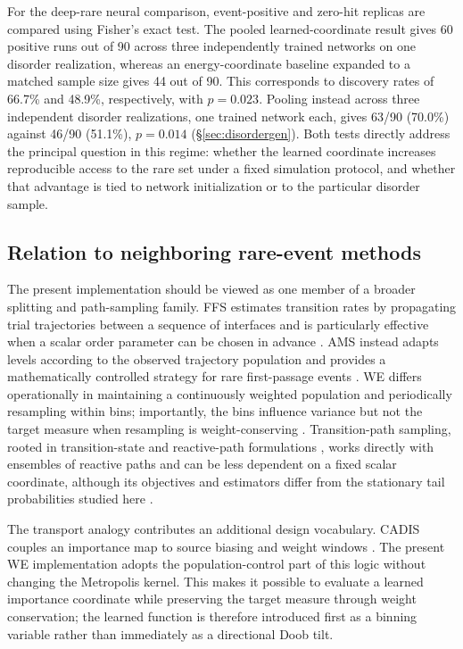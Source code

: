 \documentclass[a4paper,fleqn]{cas-sc}
\begin{document}
For the deep-rare neural comparison, event-positive and zero-hit replicas are compared using Fisher's exact test. The pooled learned-coordinate result gives 60 positive runs out of 90 across three independently trained networks on one disorder realization, whereas an energy-coordinate baseline expanded to a matched sample size gives 44 out of 90. This corresponds to discovery rates of 66.7\% and 48.9\%, respectively, with $p=0.023$. Pooling instead across three independent disorder realizations, one trained network each, gives 63/90 (70.0\%) against 46/90 (51.1\%), $p=0.014$ (\S\ref{sec:disordergen}). Both tests directly address the principal question in this regime: whether the learned coordinate increases reproducible access to the rare set under a fixed simulation protocol, and whether that advantage is tied to network initialization or to the particular disorder sample.

\subsection{Relation to neighboring rare-event methods}\label{sec:neighboring}
The present implementation should be viewed as one member of a broader splitting and path-sampling family. FFS estimates transition rates by propagating trial trajectories between a sequence of interfaces and is particularly effective when a scalar order parameter can be chosen in advance \citep{allen2009,valeriani2007}. AMS instead adapts levels according to the observed trajectory population and provides a mathematically controlled strategy for rare first-passage events \citep{cerou2007}. WE differs operationally in maintaining a continuously weighted population and periodically resampling within bins; importantly, the bins influence variance but not the target measure when resampling is weight-conserving \citep{zhang2010exact,bhatt2010,zuckerman2017}. Transition-path sampling, rooted in transition-state and reactive-path formulations \citep{chandler1978}, works directly with ensembles of reactive paths and can be less dependent on a fixed scalar coordinate, although its objectives and estimators differ from the stationary tail probabilities studied here \citep{dellago1998,bolhuis2002}.

The transport analogy contributes an additional design vocabulary. CADIS couples an importance map to source biasing and weight windows \citep{wagner1998,haghighat2003,wagner2014}. The present WE implementation adopts the population-control part of this logic without changing the Metropolis kernel. This makes it possible to evaluate a learned importance coordinate while preserving the target measure through weight conservation; the learned function is therefore introduced first as a binning variable rather than immediately as a directional Doob tilt.
\end{document}
